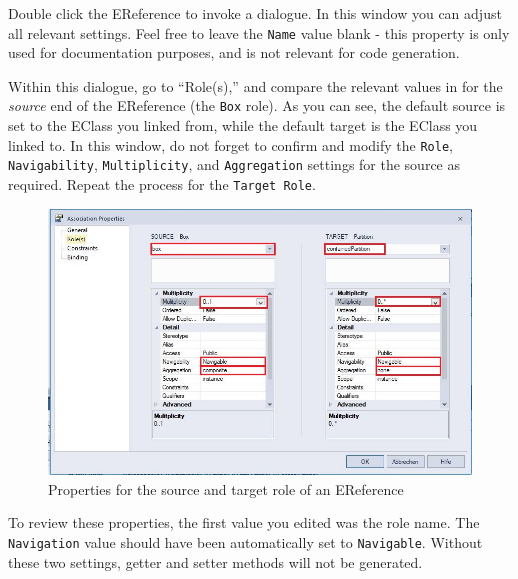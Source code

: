 \begin{stepbystep}
\item Double click the EReference to invoke a dialogue. In this window you can adjust all relevant settings. Feel free to leave the
\texttt{Name} value blank - this property is only used for documentation purposes, and is not relevant for code generation.

\item Within this dialogue, go to ``Role(s),'' and compare the relevant values in  for the \emph{source} 
end of the EReference (the \texttt{Box} role). As you can see, the default source is set to the EClass you linked from, while the default target
is the EClass you linked to. In this window, do not forget to confirm and modify the \texttt{Role}, \texttt{Navigability}, \texttt{Multiplicity}, and
\texttt{Aggregation} settings for the source as required. Repeat the process for the \texttt{Target Role}.

\vspace{0.5cm}

\begin{figure}[htbp]
	\centering
    \includegraphics[width=\textwidth]{../../org.moflon.doc.handbook.02_leitnersLearningBox/2_staticSemantics/3_connectingClasses/ccVisImages/ea_assocProps}
	\caption{Properties for the source and target role of an EReference}
	\label{ea:roles}
\end{figure}

\end{stepbystep}

To review these properties, the first value you edited was the role name. The \texttt{Navigation} value should have been automatically set to
\texttt{Na\-vi\-ga\-ble}. Without these two settings, getter and setter methods will not be generated.

